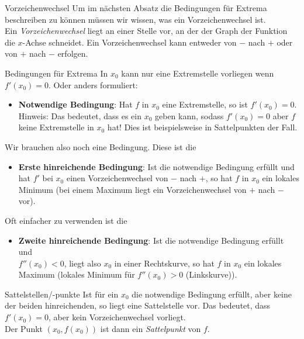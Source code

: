 \begin{bla}{Vorzeichenwechsel}
  Um im nächsten Absatz die Bedingungen für Extrema beschreiben zu können müssen wir wissen, was ein Vorzeichenwechsel ist. \\ Ein \emph{Vorzeichenwechsel} liegt an einer Stelle vor, an der der Graph der Funktion die $x$-Achse schneidet. Ein Vorzeichenwechsel kann entweder von $-$ nach $+$ oder von $+$ nach $-$ erfolgen.
\end{bla}

\begin{bla}{Bedingungen für Extrema}
  In $x_0$ kann nur eine Extremstelle vorliegen wenn $f'(x_0)=0$. Oder anders formuliert:
  \begin{itemize}
    \item \textbf{Notwendige Bedingung}: Hat $f$ in $x_0$ eine Extremstelle, so ist $f'(x_0)=0$. \\
    Hinweis: Das bedeutet, dass es ein $x_{0}$ geben kann, sodass $f'(x_{0})=0$ aber $f$ keine Extremstelle in $x_{0}$ hat! Dies ist beispielsweise in Sattelpunkten der Fall.
  \end{itemize}
  Wir brauchen also noch eine Bedingung. Diese ist die
  \begin{itemize}
    \item \textbf{Erste hinreichende Bedingung}: Ist die notwendige Bedingung erfüllt und hat $f'$ bei $x_0$ einen Vorzeichenwechsel von $-$ nach $+$, so hat $f$ in $x_0$ ein lokales Minimum (bei einem Maximum liegt ein Vorzeichenwechsel von $+$ nach $-$ vor).
  \end{itemize}
  Oft einfacher zu verwenden ist die
  \begin{itemize}
    \item \textbf{Zweite hinreichende Bedingung}: Ist die notwendige Bedingung erfüllt und \\ $f''(x_0)<0$, liegt also $x_0$ in einer Rechtskurve, so hat $f$ in $x_0$ ein lokales Maximum (lokales Minimum für $f''(x_0)>0$ (Linkskurve)).
  \end{itemize}
\end{bla}

\begin{bla}{Sattelstellen/-punkte}
  Ist für ein $x_0$ die notwendige Bedingung erfüllt, aber keine der beiden hinreichenden, so liegt eine Sattelstelle vor. Das bedeutet, dass $f'(x_0)=0$, aber kein Vorzeichenwechsel vorliegt. \\ Der Punkt $(x_0,f(x_0))$ ist dann ein \emph{Sattelpunkt} von $f$.
\end{bla}

